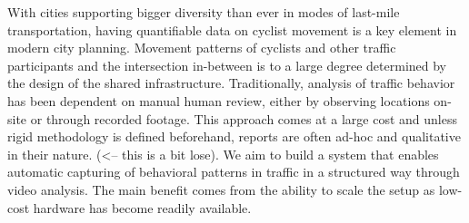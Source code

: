 With cities supporting bigger diversity than ever in modes of last-mile transportation,
having quantifiable data on cyclist movement is a key element in modern city planning. 
Movement patterns of cyclists and other traffic participants and the intersection in-between 
is to a large degree determined by the design of the shared infrastructure. 
Traditionally, analysis of traffic behavior has been dependent on manual human review, either by 
observing locations on-site or through recorded footage. This approach comes at a large cost 
and unless rigid methodology is defined beforehand, reports are often ad-hoc and qualitative in 
their nature. (<-- this is a bit lose). We aim to build a system that enables automatic capturing of behavioral 
patterns in traffic in a structured way through video analysis. The main benefit comes from the ability to 
scale the setup as low-cost hardware has become readily available.